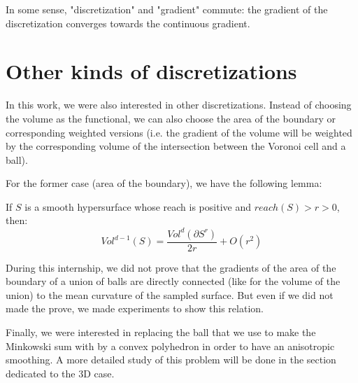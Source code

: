 In some sense, "discretization" and "gradient" commute: the gradient of the
discretization converges towards the continuous gradient.


\section{Other kinds of discretizations}


In this work, we were also interested in other discretizations. Instead of
choosing the volume as the functional, we can also choose the area of the
boundary or corresponding weighted versions (i.e. the gradient of the volume
will be weighted by the corresponding volume of the intersection between the
Voronoi cell and a ball).

For the former case (area of the boundary), we have the following lemma:
\begin{lemma}
    If $ S $ is a smooth hypersurface whose reach is positive and $ reach(S) > r
    > 0 $, then: $$ Vol^{d-1}(S) = \frac{Vol^d(\partial S^r)}{2r} + O(r^2) $$
\end{lemma}

During this internship, we did not prove that the gradients of the area of the
boundary of a union of balls are directly connected (like for the volume of the
union) to the mean curvature of the sampled surface. But even if we did not
made the prove, we made experiments to show this relation.

Finally, we were interested in replacing the ball that we use to make the
Minkowski sum with by a convex polyhedron in order to have an anisotropic
smoothing. A more detailed study of this problem will be done in the section
dedicated to the 3D case.



